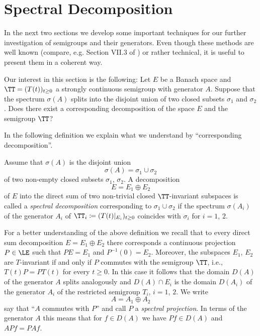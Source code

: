 \section{Spectral Decomposition}\label{sec:a3-3}

In the next two sections we develop some important techniques for our further investigation of semigroups and their generators.
Even though these methods are well known (compare, e.g. Section VII.3 of \citet{dunfordschwartz:1958}) or rather technical, it is useful to present them in a coherent way.

Our interest in this section is the following: Let $E$ be a Banach space and $\TT = (T(t))_{t \geq 0}$ a strongly continuous semigroup with generator $A$.
Suppose that the spectrum $\sigma(A)$ splits into the disjoint union of two closed subsets $\sigma_{1}$ and $\sigma_{2}$.
Does there exist a corresponding decomposition of the space $E$ and the semigroup $\TT$?

In the following definition we explain what we understand by \enquote{corresponding decomposition}.

\begin{definition}\label{def:a3-3.1}

Assume that $\sigma(A)$ is the disjoint union
\[
\sigma(A) = \sigma_{1} \cup \sigma_{2}
\]
of two non-empty closed subsets $\sigma_{1}$, $\sigma_{2}$.
A decomposition
\[
E = E_{1} \oplus E_{2}
\]
of $E$ into the direct sum of two non-trivial closed $\TT$-invariant subspaces is called a \emph{spectral decomposition} corresponding to $\sigma_{1} \cup \sigma_{2}$ if the spectrum $\sigma(A_{i})$ of the generator $A_{i}$ of $\TT_{i} \coloneqq (T(t)|_{E_{i}})_{t \geq 0}$ coincides with $\sigma_{i}$ for $i = 1$, $2$.
\end{definition}




For a better understanding of the above definition we recall that to every direct sum decomposition $E = E_{1} \oplus E_{2}$ there corresponds a continuous projection $P \in \LE$ such that $PE = E_{1}$ and $P^{-1}(0) = E_{2}$.
Moreover, the subspaces $E_{1}$, $E_{2}$ are $T$-invariant if and only if $P$ commutes with the semigroup $\TT$, i.e., $T(t)P = PT(t)$ for every $t \geq 0$.
In this case it follows that the domain $D(A)$ of the generator $A$ splits analogously and $D(A) \cap E_{i}$ is the domain $D(A_{i})$ of the generator $A_{i}$ of the restricted semigroup $T_{i}$, $i = 1$, $2$.
We write
\[
A = A_{1} \oplus A_{2}
\]
say that \enquote{$A$ commutes with $P$} and call $P$ a \emph{spectral projection}.
In terms of the generator $A$ this means that for $f \in D(A)$ we have $Pf \in D(A)$ and $APf = PAf$.

